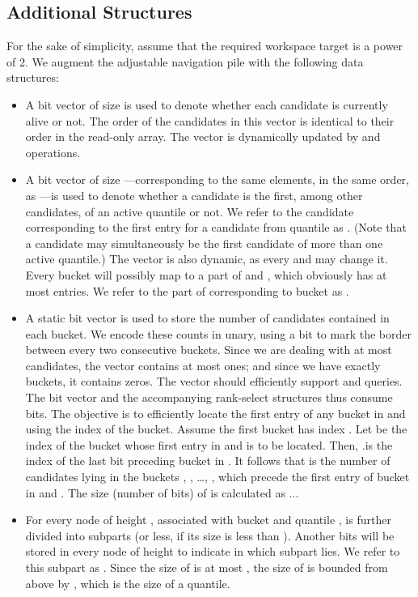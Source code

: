 \documentclass[final,onetabnum,onefignum,onethmnum]{siamltex}
\newcommand{\Insert}{\mbox{}}
\newcommand{\Extract}{\mbox{}}
\newcommand{\Rank}{\mbox{}}
\newcommand{\Select}{\mbox{}}
\begin{document}
\subsection{Additional Structures} 
For the sake of simplicity, assume that the required workspace target  is
a power of 2.  We augment the adjustable navigation pile with the
following data structures:
\begin{itemize}
\item A bit vector  of size  is used to denote
  whether each candidate is currently alive or not. The order of the
  candidates in this vector is identical to their order in the read-only
  array. The  vector is dynamically updated by \Insert{}
  and \Extract{} operations.

\item A bit vector  of size ---corresponding to the same
  elements, in the same order, as ---is
  used to denote whether a candidate is the first, among other
  candidates, of an active quantile or not. We refer to the candidate corresponding to the first entry for a  
  candidate from quantile  as .
	(Note that a candidate may simultaneously be the first candidate of more than one active quantile.) 
	The  vector is also dynamic, as every
  \Insert{} and \Extract{} may change it.  Every bucket will possibly map
  to a part of  and , which obviously has at
  most  entries.  We refer to the part of 
  corresponding to bucket  as .

\item A static bit vector  is used to store the number
  of candidates contained in each bucket. We encode these counts in
  unary, using a  bit to mark the border between every two
  consecutive buckets. Since we are dealing with at most 
  candidates, the vector contains at most  ones; and since we have
  exactly  buckets, it contains  zeros. The 
  vector should efficiently support \Rank{} and \Select{} queries. The
  bit vector and the accompanying rank-select structures thus consume
   bits.  The objective is to efficiently locate the first
  entry of any bucket in  and  using the index of the bucket. 
	Assume the first bucket has index . Let  be the index of the bucket whose first
  entry in  and  is to be located. Then, .\Select is the index of the last  bit
  preceding bucket  in .  It follows that 
  is the number of candidates lying in the buckets , , \dots,
  , which precede the first entry of bucket  in
   and . The size (number of bits)
  of  is calculated as 
	.\Select  .\Select.

\item For every node of height , associated with bucket  and
  quantile ,  is further divided into 
  subparts (or less, if its size is less than ). Another  bits
  will be stored in every node of height  to indicate in which
  subpart  lies. We refer to
  this subpart as . Since the size of
   is at most , the size of
   is bounded from above by , which is the size of a quantile.


\end{itemize}
\end{document}

